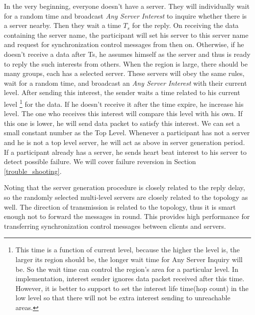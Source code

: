 \documentclass[conference]{IEEEtran}
\begin{document}
In the very beginning,
everyone doesn't have a server.
They will individually wait for a random time and broadcast
\emph{Any Server Interest} to inquire whether there is a server nearby.
Then they wait a time $T_s$ for the reply.
On receiving the data containing the server name,
the participant will set his server to this server name and request for synchronization control messages from then on.
Otherwise, if he doesn't receive a data after Ts,
he assumes himself as the server and thus is ready to reply the such interests from others.
When the region is large, there should be many groups, each has a selected server.
These servers will obey the same rules, wait for a random time,
and broadcast an \emph{Any Server Interest} with their current level.
After sending this interest,
the sender waits a time related to his current level
\footnote{This time is a function of current level, because the higher the level is,
the larger its region should be, the longer wait time for Any Server Inquiry will be.
So the wait time can control the region's area for a particular level.
In implementation, interest sender ignores data packet received after this time.
However, it is better to support to set the interest life time(hop count) in the low level
so that there will not be extra interest sending to unreachable areas.} for the data.
If he doesn't receive it after the time expire, he increase his level.
The one who receives this interest will compare this level with his own.
If this one is lower, he will send data packet to satisfy this interest.
We can set a small constant number as the Top Level.
Whenever a participant has not a server and he is not a top level server,
he will act as above in server generation period.
If a participant already has a server,
he sends heart beat interest to his server to detect possible failure.
We will cover failure reversion in Section \ref{trouble_shooting}.

Noting that the server generation procedure is closely related to the reply delay,
so the randomly selected multi-level servers are closely related to the topology as well.
The direction of transmission is related to the topology,
thus it is smart enough not to forward the messages in round.
This provides high performance for transferring synchronization control messages between clients and servers.
\end{document}

